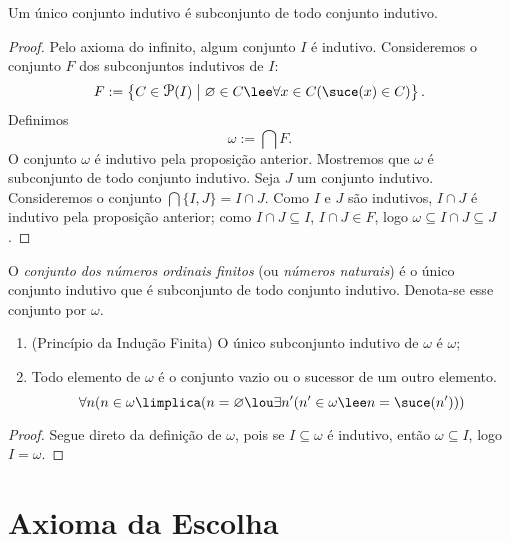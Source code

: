\begin{prop}
Um único conjunto indutivo é subconjunto de todo conjunto indutivo.
\end{prop}
\begin{proof}
Pelo axioma do infinito, algum conjunto $I$ é indutivo. Consideremos o conjunto $F$ dos subconjuntos indutivos de $I$:
	\begin{equation*}
	F := \set{C \in \p(I)}{\emptyset \in C \lee \forall x \in C(\suce(x) \in C)}.
	\end{equation*}
Definimos
	\begin{equation*}
	\omega := \bigcap F.
	\end{equation*}
O conjunto $\omega$ é indutivo pela proposição anterior. Mostremos que $\omega$ é subconjunto de todo conjunto indutivo. Seja $J$ um conjunto indutivo. Consideremos o conjunto $\bigcap\{I,J\} = I \cap J$. Como $I$ e $J$ são indutivos, $I \cap J$ é indutivo pela proposição anterior; como $I \cap J \subseteq I$, $I \cap J \in F$, logo $\omega \subseteq I \cap J \subseteq J$.
\end{proof}

\begin{defi}
O \emph{conjunto dos números ordinais finitos} (ou \emph{números naturais}) é o único conjunto indutivo que é subconjunto de todo conjunto indutivo. Denota-se esse conjunto por $\omega$.
\end{defi}

\begin{prop}
	\begin{enumerate}
	\item (Princípio da Indução Finita) O único subconjunto indutivo de $\omega$ é $\omega$;
	\item Todo elemento de $\omega$ é o conjunto vazio ou o sucessor de um outro elemento.
		\begin{equation*}
		\forall n (n \in \omega \limplica (n=\emptyset \lou \exists n' (n' \in \omega \lee n=\suce(n')))
		\end{equation*}
	\end{enumerate}
\end{prop}
\begin{proof}
Segue direto da definição de $\omega$, pois se $I \subseteq \omega$ é indutivo, então $\omega \subseteq I$, logo $I = \omega$.
\end{proof}



\section{Axioma da Escolha}

